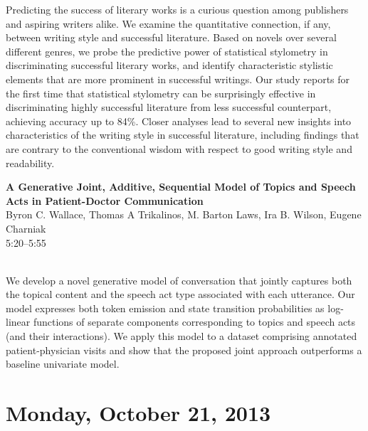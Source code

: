 \documentclass[twoside,makeidx]{book}
\begin{document}
\nopagebreak%
\noindent%
{\small Predicting the success of literary works is a curious question among publishers and aspiring writers alike. We examine the quantitative connection, if any, between writing style and successful literature. Based on novels over several different genres, we probe the predictive power of statistical stylometry in discriminating successful literary works, and identify characteristic stylistic elements that are more prominent in successful writings. Our study reports for the first time that statistical stylometry can be surprisingly effective in discriminating highly successful literature from less successful counterpart, achieving accuracy up to 84\%. Closer analyses lead to several new insights into characteristics of the writing style in successful literature, including findings that are contrary to the conventional wisdom with respect to good writing style and readability.}
\par\vspace{2em}\noindent%
\begin{minipage}{\linewidth}%
\begin{center}
\textbf{\normalsize A Generative Joint, Additive, Sequential Model of Topics and Speech Acts in Patient-Doctor Communication}\\
\normalsize  Byron C. Wallace,  Thomas A Trikalinos,  M. Barton Laws,  Ira B. Wilson,  Eugene Charniak\\
{\small 5:20--5:55}\\
\end{center}
\end{minipage}\\[0.5em]
\nopagebreak%
\noindent%
{\small We develop a novel generative model of conversation that jointly captures both the topical content and the speech act type associated with each utterance. Our model expresses both token emission and state transition probabilities as log-linear functions of separate components corresponding to topics and speech acts (and their interactions). We apply this model to a dataset comprising annotated patient-physician visits and show that the proposed joint approach outperforms a baseline univariate model.}
\clearpage
\chapter{Monday, October 21, 2013}
\end{document}
